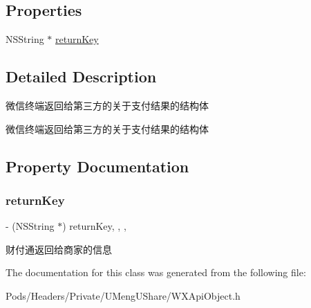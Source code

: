 \subsection*{Properties}
\begin{DoxyCompactItemize}
\item 
N\+S\+String $\ast$ \mbox{\hyperlink{interface_pay_resp_af8d3170003a653d770a0837f004ac439}{return\+Key}}
\end{DoxyCompactItemize}


\subsection{Detailed Description}
微信终端返回给第三方的关于支付结果的结构体 

微信终端返回给第三方的关于支付结果的结构体 

\subsection{Property Documentation}
\mbox{\label{interface_pay_resp_af8d3170003a653d770a0837f004ac439}} 
\subsubsection{\texorpdfstring{return\+Key}{returnKey}}
{\footnotesize\ttfamily -\/ (N\+S\+String $\ast$) return\+Key\hspace{0.3cm}{\ttfamily [read]}, {\ttfamily [write]}, {\ttfamily [nonatomic]}, {\ttfamily [retain]}}

财付通返回给商家的信息 

The documentation for this class was generated from the following file\+:\begin{DoxyCompactItemize}
\item 
Pods/\+Headers/\+Private/\+U\+Meng\+U\+Share/W\+X\+Api\+Object.\+h\end{DoxyCompactItemize}
